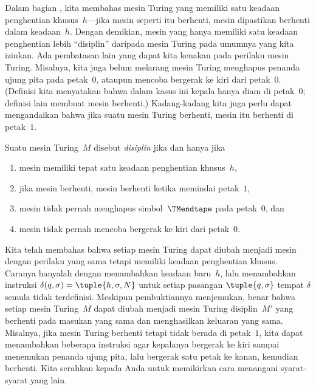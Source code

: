 \documentclass[../../../include/open-logic-section]{subfiles}
\begin{document}

\begin{explain}
Dalam bagian , kita membahas mesin Turing yang memiliki satu
keadaan penghentian khusus~$h$---jika mesin seperti itu berhenti, mesin
dipastikan berhenti dalam keadaan~$h$. Dengan demikian, mesin yang hanya
memiliki satu keadaan penghentian lebih ``disiplin'' daripada mesin Turing
pada umumnya yang kita izinkan. Ada pembatasan lain yang dapat kita kenakan
pada perilaku mesin Turing. Misalnya, kita juga belum melarang mesin Turing
menghapus penanda ujung pita pada petak~$0$, ataupun mencoba bergerak ke kiri
dari petak~$0$. (Definisi kita menyatakan bahwa dalam kasus ini kepala hanya
diam di petak~$0$; definisi lain membuat mesin berhenti.) Kadang-kadang kita
juga perlu dapat mengandaikan bahwa jika suatu mesin Turing berhenti, mesin
itu berhenti di petak~$1$.
\end{explain}

\begin{defn}
Suatu mesin Turing~$M$ disebut \emph{disiplin} jika dan hanya jika
\begin{enumerate}
    \item mesin memiliki tepat satu keadaan penghentian khusus~$h$,
    \item jika mesin berhenti, mesin berhenti ketika memindai petak~$1$,
    \item mesin tidak pernah menghapus simbol~$\TMendtape$ pada petak~$0$, dan
    \item mesin tidak pernah mencoba bergerak ke kiri dari petak~$0$.
\end{enumerate}
\end{defn}

\begin{explain}
Kita telah membahas bahwa setiap mesin Turing dapat diubah menjadi mesin
dengan perilaku yang sama tetapi memiliki keadaan penghentian khusus. Caranya
hanyalah dengan menambahkan keadaan baru~$h$, lalu menambahkan instruksi
$\delta(q, \sigma) = \tuple{h, \sigma, N}$ untuk setiap pasangan
$\tuple{q,\sigma}$ tempat $\delta$ semula tidak terdefinisi. Meskipun
pembuktiannya menjemukan, benar bahwa setiap mesin Turing~$M$ dapat diubah
menjadi mesin Turing disiplin~$M'$ yang berhenti pada masukan yang sama dan
menghasilkan keluaran yang sama. Misalnya, jika mesin Turing berhenti tetapi
tidak berada di petak~$1$, kita dapat menambahkan beberapa instruksi agar
kepalanya bergerak ke kiri sampai menemukan penanda ujung pita, lalu bergerak
satu petak ke kanan, kemudian berhenti. Kita serahkan kepada Anda untuk
memikirkan cara menangani syarat-syarat yang lain.
\end{explain}
\end{document}
